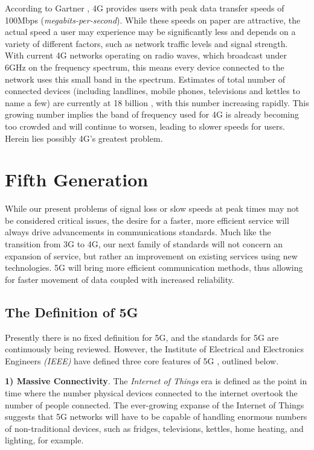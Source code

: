 \documentclass[journal]{IEEEtran}
\begin{document}
According to Gartner \cite{gartner4g}, 4G provides users with peak data transfer speeds of 100Mbps (\textit{megabits-per-second}). While these speeds on paper are attractive, the actual speed a user may experience may be significantly less and depends on a variety of different factors, such as network traffic levels and signal strength. With current 4G networks operating on radio waves, which broadcast under 6GHz on the frequency spectrum, this means every device connected to the network uses this small band in the spectrum. Estimates of total number of connected devices (including landlines, mobile phones, televisions and kettles to name a few) are currently at 18 billion \cite{ericssondev}, with this number increasing rapidly. This growing number implies the band of frequency used for 4G is already becoming too crowded and will continue to worsen, leading to slower speeds for users. Herein lies possibly 4G's greatest problem.

\section{Fifth Generation}
While our present problems of signal loss or slow speeds at peak times may not be considered critical issues, the desire for a faster, more efficient service will always drive advancements in communications standards. Much like the transition from 3G to 4G, our next family of standards will not concern an expansion of service, but rather an improvement on existing services using new technologies. 5G will bring more efficient communication methods, thus allowing for faster movement of data coupled with increased reliability.

\subsection{The Definition of 5G} \label{subsec:def5g}
Presently there is no fixed definition for 5G, and the standards for 5G are continuously being reviewed. However, the Institute of Electrical and Electronics Engineers \textit{(IEEE)} have defined three core features of 5G \cite{ieee5g}, outlined below. 

\textbf{1) Massive Connectivity}. The \textit{Internet of Things} era is defined as the point in time where the number physical devices connected to the internet overtook the number of people connected. The ever-growing expanse of the Internet of Things suggests that 5G networks will have to be capable of handling enormous numbers of non-traditional devices, such as fridges, televisions, kettles, home heating, and lighting, for example.
\end{document}
